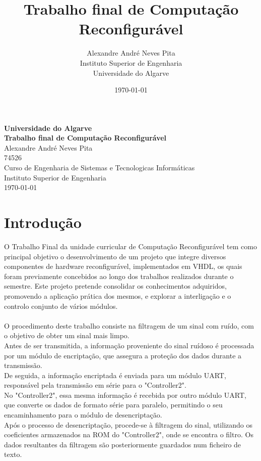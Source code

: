 \documentclass[12pt, a4paper]{article}
\title{Trabalho final de Computação Reconfigurável}
\author{Alexandre André Neves Pita\\
Instituto Superior de Engenharia \\
Universidade do Algarve \\}
\date{\today}
\begin{document}
\begin{titlepage}
    \centering
    \vspace*{2cm}

    {\Large\textbf{Universidade do Algarve}}\\[1.5cm]

    {\Huge\textbf{Trabalho final de Computação Reconfigurável}}\\[2cm]

    {\Large Alexandre André Neves Pita}\\
    74526\\[1.5cm]

    {\large Curso de Engenharia de Sistemas e Tecnologicas Informáticas}\\
    Instituto Superior de Engenharia\\[2cm]

    {\large \today}

    \vfill
\end{titlepage}
\newpage
\tableofcontents
\newpage


\section{Introdução}
O Trabalho Final da unidade curricular de Computação Reconfigurável tem como principal objetivo o desenvolvimento de um projeto que integre diversos componentes de hardware reconfigurável,
 implementados em VHDL, os quais foram previamente concebidos ao longo dos trabalhos realizados durante o semestre.
Este projeto pretende consolidar os conhecimentos adquiridos, promovendo a aplicação prática dos mesmos, e explorar a interligação e o controlo conjunto de vários módulos.\\
\\
O procedimento deste trabalho consiste na filtragem de um sinal com ruído, com o objetivo de obter um sinal mais limpo.\\  
Antes de ser transmitida, a informação proveniente do sinal ruídoso é processada por um módulo de encriptação, que assegura a proteção dos dados durante a transmissão.\\
De seguida, a informação encriptada é enviada para um módulo UART, responsável pela transmissão em série para o "Controller2".\\
No "Controller2", essa mesma informação é recebida por outro módulo UART, que converte os dados de formato série para paralelo, permitindo o seu encaminhamento para o módulo de desencriptação.\\
Após o processo de desencriptação, procede-se à filtragem do sinal, utilizando os coeficientes armazenados na ROM do "Controller2", onde se encontra o filtro. Os dados resultantes da filtragem são posteriormente guardados num ficheiro de texto.\\
\end{document}
